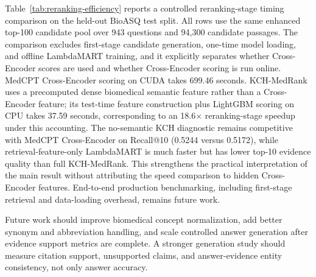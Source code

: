 

Table~\ref{tab:reranking-efficiency} reports a controlled reranking-stage timing comparison on the held-out BioASQ test split. All rows use the same enhanced top-100 candidate pool over 943 questions and 94,300 candidate passages. The comparison excludes first-stage candidate generation, one-time model loading, and offline LambdaMART training, and it explicitly separates whether Cross-Encoder scores are used and whether Cross-Encoder scoring is run online. MedCPT Cross-Encoder scoring on CUDA takes 699.46 seconds. KCH-MedRank uses a precomputed dense biomedical semantic feature rather than a Cross-Encoder feature; its test-time feature construction plus LightGBM scoring on CPU takes 37.59 seconds, corresponding to an 18.6$\times$ reranking-stage speedup under this accounting. The no-semantic KCH diagnostic remains competitive with MedCPT Cross-Encoder on Recall@10 (0.5244 versus 0.5172), while retrieval-feature-only LambdaMART is much faster but has lower top-10 evidence quality than full KCH-MedRank. This strengthens the practical interpretation of the main result without attributing the speed comparison to hidden Cross-Encoder features. End-to-end production benchmarking, including first-stage retrieval and data-loading overhead, remains future work.

Future work should improve biomedical concept normalization, add better synonym and abbreviation handling, and scale controlled answer generation after evidence support metrics are complete. A stronger generation study should measure citation support, unsupported claims, and answer-evidence entity consistency, not only answer accuracy.
